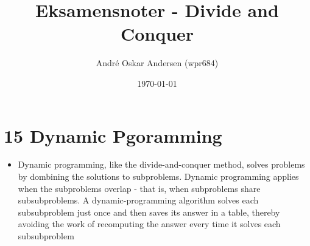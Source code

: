 \documentclass{report}
\title{Eksamensnoter - Divide and Conquer}
\author{André Oskar Andersen (wpr684)}
\date{\today}
\begin{document}
\maketitle

\section*{15 Dynamic Pgoramming}
\begin{itemize}
    \item Dynamic programming, like the divide-and-conquer method, solves problems by dombining the solutions to subproblems. Dynamic programming applies when the subproblems overlap - that is, when subproblems share subsubproblems. A dynamic-programming algorithm solves each subsubproblem just once and then saves its answer in a table, thereby avoiding the work of recomputing the answer every time it solves each subsubproblem
\end{itemize}
\end{document}
